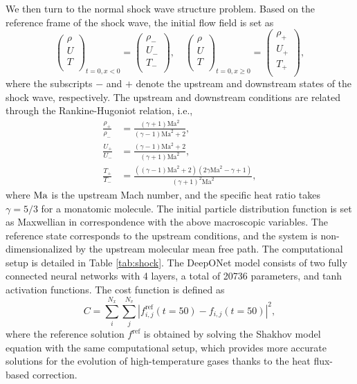 \documentclass[preprint,3p,12pt,sort&compress]{elsarticle}
\begin{document}
We then turn to the normal shock wave structure problem.
Based on the reference frame of the shock wave, the initial flow field is set as
\begin{equation}
    \left(\begin{array}{c}
    \rho \\
    U \\
    T \\
    \end{array}\right)_{{t=0,x<0}}=\left(\begin{array}{c}
    \rho_- \\
    U_- \\
    T_- \\
    \end{array}\right), \quad 
    \left(\begin{array}{c}
    \rho \\
    U \\
    T \\
    \end{array}\right)_{{t=0,x\ge 0}}=\left(\begin{array}{c}
    \rho_+ \\
    U_+ \\
    T_+ \\
    \end{array}\right),
\end{equation}
where the subscripts $-$ and $+$ denote the upstream and downstream states of the shock wave, respectively.
The upstream and downstream conditions are related through the Rankine-Hugoniot relation, i.e.,
\begin{equation}
\begin{aligned}
    \frac{\rho_{+}}{\rho_{-}} &=\frac{(\gamma+1) \mathrm{Ma}^{2}}{(\gamma-1) \mathrm{Ma}^{2}+2}, \\
    \frac{U_{+}}{U_{-}} &=\frac{(\gamma-1) \mathrm{Ma}^{2}+2}{(\gamma+1) \mathrm{Ma}^{2}}, \\
    \frac{T_{+}}{T_{-}} &=\frac{\left((\gamma-1) \mathrm{Ma}^{2}+2\right)\left(2 \gamma \mathrm{Ma}^{2}-\gamma+1\right)}{(\gamma+1)^{2} \mathrm{Ma}^{2}},
\end{aligned}
\end{equation}
where $\rm Ma$ is the upstream Mach number, and the specific heat ratio takes $\gamma=5/3$ for a monatomic molecule.
The initial particle distribution function is set as Maxwellian in correspondence with the above macroscopic variables.
The reference state corresponds to the upstream conditions, and the system is non-dimensionalized by the upstream molecular mean free path.
The computational setup is detailed in Table \ref{tab:shock}.
The DeepONet model consists of two fully connected neural networks with 4 layers, a total of 20736 parameters, and tanh activation functions.
The cost function is defined as 
\begin{equation}
    C = \sum_i^{N_x}\sum_j^{N_v} |f_{i,j}^{\mathrm{ref}}(t=50)-f_{i,j}(t=50)|^2,
\end{equation}
where the reference solution $f^\mathrm{ref}$ is obtained by solving the Shakhov model equation with the same computational setup, which provides more accurate solutions for the evolution of high-temperature gases thanks to the heat flux-based correction.
\end{document}
